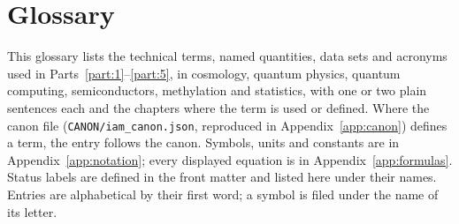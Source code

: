 \chapter{Glossary}\label{app:glossary}
This glossary lists the technical terms, named quantities, data sets and acronyms used in Parts~\ref{part:1}--\ref{part:5}, in cosmology, quantum
physics, quantum computing, semiconductors, methylation and statistics, with one or two plain sentences each and the chapters where the term is
used or defined. Where the canon file (\texttt{CANON/\allowbreak{}iam\_canon.json}, reproduced in Appendix~\ref{app:canon}) defines a term, the entry
follows the canon. Symbols, units and constants are in Appendix~\ref{app:notation}; every displayed equation is in Appendix~\ref{app:formulas}.
Status labels are defined in the front matter and listed here under their names. Entries are alphabetical by their first word; a symbol is
filed under the name of its letter.
